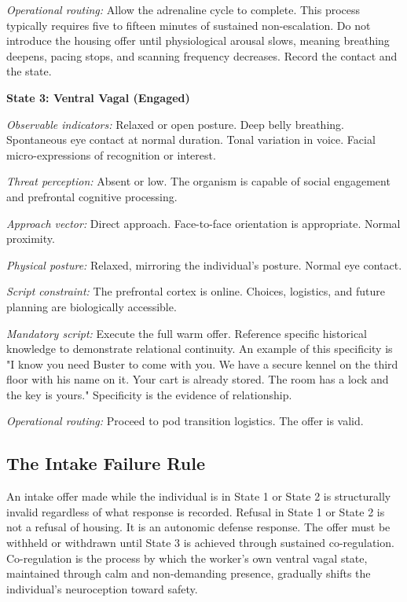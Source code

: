 \documentclass[12pt, letterpaper]{article}
\begin{document}
\textit{Operational routing:} Allow the adrenaline cycle to complete. This process typically requires five to fifteen minutes of sustained non-escalation. Do not introduce the housing offer until physiological arousal slows, meaning breathing deepens, pacing stops, and scanning frequency decreases. Record the contact and the state.

\textbf{State 3: Ventral Vagal (Engaged)}

\textit{Observable indicators:} Relaxed or open posture. Deep belly breathing. Spontaneous eye contact at normal duration. Tonal variation in voice. Facial micro-expressions of recognition or interest.

\textit{Threat perception:} Absent or low. The organism is capable of social engagement and prefrontal cognitive processing.

\textit{Approach vector:} Direct approach. Face-to-face orientation is appropriate. Normal proximity.

\textit{Physical posture:} Relaxed, mirroring the individual's posture. Normal eye contact.

\textit{Script constraint:} The prefrontal cortex is online. Choices, logistics, and future planning are biologically accessible.

\textit{Mandatory script:} Execute the full warm offer. Reference specific historical knowledge to demonstrate relational continuity. An example of this specificity is "I know you need Buster to come with you. We have a secure kennel on the third floor with his name on it. Your cart is already stored. The room has a lock and the key is yours." Specificity is the evidence of relationship.

\textit{Operational routing:} Proceed to pod transition logistics. The offer is valid.

\subsection{The Intake Failure Rule}

An intake offer made while the individual is in State 1 or State 2 is structurally invalid regardless of what response is recorded. Refusal in State 1 or State 2 is not a refusal of housing. It is an autonomic defense response. The offer must be withheld or withdrawn until State 3 is achieved through sustained co-regulation. Co-regulation is the process by which the worker's own ventral vagal state, maintained through calm and non-demanding presence, gradually shifts the individual's neuroception toward safety.
\end{document}
